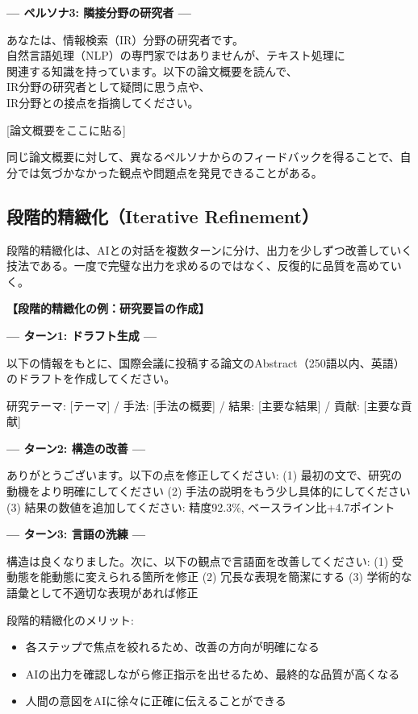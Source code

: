 \begin{promptbox}
\textbf{--- ペルソナ3: 隣接分野の研究者 ---}

あなたは、情報検索（IR）分野の研究者です。\\
自然言語処理（NLP）の専門家ではありませんが、テキスト処理に\\
関連する知識を持っています。以下の論文概要を読んで、\\
IR分野の研究者として疑問に思う点や、\\
IR分野との接点を指摘してください。

{[}論文概要をここに貼る]
\end{promptbox}

同じ論文概要に対して、異なるペルソナからのフィードバックを得ることで、自分では気づかなかった観点や問題点を発見できることがある。

\subsection{段階的精緻化（Iterative Refinement）}

段階的精緻化は、AIとの対話を複数ターンに分け、出力を少しずつ改善していく技法である。一度で完璧な出力を求めるのではなく、反復的に品質を高めていく。

\begin{promptbox}
\textbf{【段階的精緻化の例：研究要旨の作成】}

\textbf{--- ターン1: ドラフト生成 ---}

以下の情報をもとに、国際会議に投稿する論文のAbstract（250語以内、英語）のドラフトを作成してください。

研究テーマ: [テーマ] / 手法: [手法の概要] / 結果: [主要な結果] / 貢献: [主要な貢献]

\textbf{--- ターン2: 構造の改善 ---}

ありがとうございます。以下の点を修正してください:
(1) 最初の文で、研究の動機をより明確にしてください
(2) 手法の説明をもう少し具体的にしてください
(3) 結果の数値を追加してください: 精度92.3\%, ベースライン比+4.7ポイント

\textbf{--- ターン3: 言語の洗練 ---}

構造は良くなりました。次に、以下の観点で言語面を改善してください:
(1) 受動態を能動態に変えられる箇所を修正
(2) 冗長な表現を簡潔にする
(3) 学術的な語彙として不適切な表現があれば修正
\end{promptbox}

段階的精緻化のメリット:
\begin{itemize}
\item 各ステップで焦点を絞れるため、改善の方向が明確になる
\item AIの出力を確認しながら修正指示を出せるため、最終的な品質が高くなる
\item 人間の意図をAIに徐々に正確に伝えることができる
\end{itemize}

